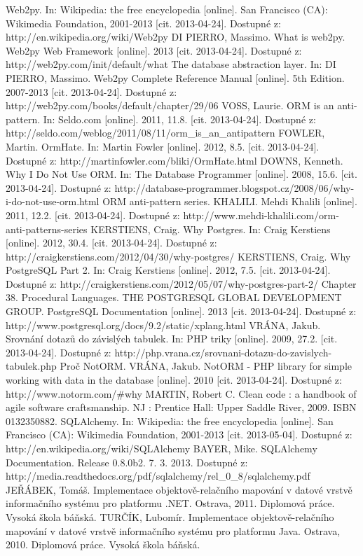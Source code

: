 \documentclass[ing,male,java,dept456]{diploma}						%
\begin{document}
\begin{thebibliography}{99}
 Web2py. In: Wikipedia: the free encyclopedia [online]. San Francisco (CA): Wikimedia Foundation, 2001-2013 [cit. 2013-04-24]. Dostupné z: http://en.wikipedia.org/wiki/Web2py
 DI PIERRO, Massimo. What is web2py. Web2py Web Framework [online]. 2013 [cit. 2013-04-24]. Dostupné z: http://web2py.com/init/default/what
 The database abstraction layer. In: DI PIERRO, Massimo. Web2py Complete Reference Manual [online]. 5th Edition. 2007-2013 [cit. 2013-04-24]. Dostupné z: http://web2py.com/books/default/chapter/29/06
 VOSS, Laurie. ORM is an anti-pattern. In: Seldo.com [online]. 2011, 11.8. [cit. 2013-04-24]. Dostupné z: http://seldo.com/weblog/2011/08/11/orm\_is\_an\_antipattern
 FOWLER, Martin. OrmHate. In: Martin Fowler [online]. 2012, 8.5. [cit. 2013-04-24]. Dostupné z: http://martinfowler.com/bliki/OrmHate.html
 DOWNS, Kenneth. Why I Do Not Use ORM. In: The Database Programmer [online]. 2008, 15.6. [cit. 2013-04-24]. Dostupné z: http://database-programmer.blogspot.cz/2008/06/why-i-do-not-use-orm.html
 ORM anti-pattern series. KHALILI. Mehdi Khalili [online]. 2011, 12.2. [cit. 2013-04-24]. Dostupné z: http://www.mehdi-khalili.com/orm-anti-patterns-series
 KERSTIENS, Craig. Why Postgres. In: Craig Kerstiens [online]. 2012, 30.4. [cit. 2013-04-24]. Dostupné z: http://craigkerstiens.com/2012/04/30/why-postgres/
 KERSTIENS, Craig. Why PostgreSQL Part 2. In: Craig Kerstiens [online]. 2012, 7.5. [cit. 2013-04-24]. Dostupné z: http://craigkerstiens.com/2012/05/07/why-postgres-part-2/
 Chapter 38. Procedural Languages. THE POSTGRESQL GLOBAL DEVELOPMENT GROUP. PostgreSQL Documentation [online]. 2013 [cit. 2013-04-24]. Dostupné z: http://www.postgresql.org/docs/9.2/static/xplang.html
 VRÁNA, Jakub. Srovnání dotazů do závislých tabulek. In: PHP triky [online]. 2009, 27.2. [cit. 2013-04-24]. Dostupné z: http://php.vrana.cz/srovnani-dotazu-do-zavislych-tabulek.php
 Proč NotORM. VRÁNA, Jakub. NotORM - PHP library for simple working with data in the database [online]. 2010 [cit. 2013-04-24]. Dostupné z: http://www.notorm.com/\#why
 MARTIN, Robert C. Clean code : a handbook of agile software craftsmanship. NJ : Prentice Hall: Upper Saddle River, 2009. ISBN 0132350882.
 SQLAlchemy. In: Wikipedia: the free encyclopedia [online]. San Francisco (CA): Wikimedia Foundation, 2001-2013 [cit. 2013-05-04]. Dostupné z: http://en.wikipedia.org/wiki/SQLAlchemy
 BAYER, Mike. SQLAlchemy Documentation. Release 0.8.0b2. 7. 3. 2013. Dostupné z: http://media.readthedocs.org/pdf/sqlalchemy/rel\_0\_8/sqlalchemy.pdf
 JEŘÁBEK, Tomáš. Implementace objektově-relačního mapování v datové vrstvě informačního systému pro platformu .NET. Ostrava, 2011. Diplomová práce. Vysoká škola báňská.
 TURČÍK, Lubomír. Implementace objektově-relačního mapování v datové vrstvě informačního systému pro platformu Java. Ostrava, 2010. Diplomová práce. Vysoká škola báňská.
\end{thebibliography}
\end{document}
